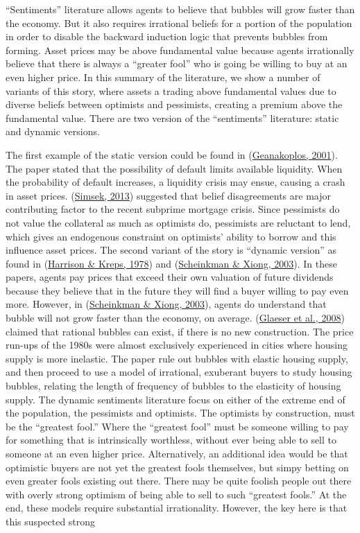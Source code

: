 \documentclass[
  12pt,
]{article}
\begin{document}
``Sentiments'' literature allows agents to believe that bubbles will grow faster than the economy. But it also requires irrational beliefs for a portion of the population in order to disable the backward induction logic that prevents bubbles from forming. Asset prices may be above fundamental value because agents irrationally believe that there is always a ``greater fool'' who is going be willing to buy at an even higher price. In this summary of the literature, we show a number of variants of this story, where assets a trading above fundamental values due to diverse beliefs between optimists and pessimists, creating a premium above the fundamental value. There are two version of the ``sentiments'' literature: static and dynamic versions.

The first example of the static version could be found in (\protect\hyperlink{ref-geanakoplos_liquidity_2001}{Geanakoplos, 2001}). The paper stated that the possibility of default limits available liquidity. When the probability of default increases, a liquidity crisis may ensue, causing a crash in asset prices. (\protect\hyperlink{ref-simsek_belief_2013}{Simsek, 2013}) suggested that belief disagreements are major contributing factor to the recent subprime mortgage crisis. Since pessimists do not value the collateral as much as optimists do, pessimists are reluctant to lend, which gives an endogenous constraint on optimists' ability to borrow and this influence asset prices. The second variant of the story is ``dynamic version'' as found in (\protect\hyperlink{ref-harrison_speculative_1978}{Harrison \& Kreps, 1978}) and (\protect\hyperlink{ref-scheinkman_overconfidence_2003}{Scheinkman \& Xiong, 2003}). In these papers, agents pay prices that exceed their own valuation of future dividends because they believe that in the future they will find a buyer willing to pay even more. However, in (\protect\hyperlink{ref-scheinkman_overconfidence_2003}{Scheinkman \& Xiong, 2003}), agents do understand that bubble will not grow faster than the economy, on average. (\protect\hyperlink{ref-glaeser_housing_2008}{Glaeser et al., 2008}) claimed that rational bubbles can exist, if there is no new construction. The price run-ups of the 1980s were almost exclusively experienced in cities where housing supply is more inelastic. The paper rule out bubbles with elastic housing supply, and then proceed to use a model of irrational, exuberant buyers to study housing bubbles, relating the length of frequency of bubbles to the elasticity of housing supply. The dynamic sentiments literature focus on either of the extreme end of the population, the pessimists and optimists. The optimists by construction, must be the ``greatest fool.'' Where the ``greatest fool'' must be someone willing to pay for something that is intrinsically worthless, without ever being able to sell to someone at an even higher price. Alternatively, an additional idea would be that optimistic buyers are not yet the greatest fools themselves, but simpy betting on even greater fools existing out there. There may be quite foolish people out there with overly strong optimism of being able to sell to such ``greatest fools.'' At the end, these models require substantial irrationality. However, the key here is that this suspected strong 
\end{document}

